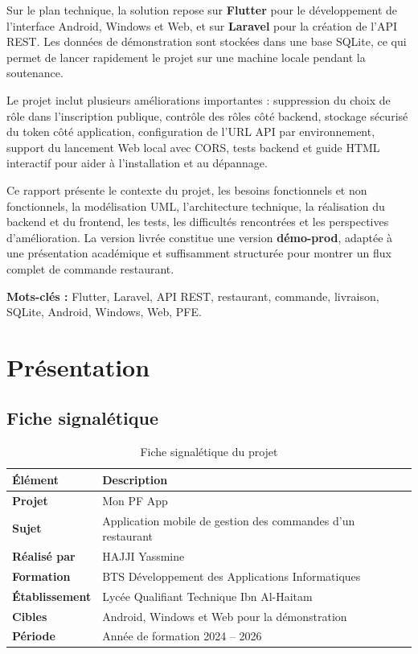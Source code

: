\documentclass[12pt,a4paper]{report}
\newcommand{\field}[2]{\textbf{#1} & #2\\}
\begin{document}
Sur le plan technique, la solution repose sur \textbf{Flutter} pour le développement de l'interface Android, Windows et Web, et sur \textbf{Laravel} pour la création de l'API REST. Les données de démonstration sont stockées dans une base SQLite, ce qui permet de lancer rapidement le projet sur une machine locale pendant la soutenance.

Le projet inclut plusieurs améliorations importantes : suppression du choix de rôle dans l'inscription publique, contrôle des rôles côté backend, stockage sécurisé du token côté application, configuration de l'URL API par environnement, support du lancement Web local avec CORS, tests backend et guide HTML interactif pour aider à l'installation et au dépannage.

Ce rapport présente le contexte du projet, les besoins fonctionnels et non fonctionnels, la modélisation UML, l'architecture technique, la réalisation du backend et du frontend, les tests, les difficultés rencontrées et les perspectives d'amélioration. La version livrée constitue une version \textbf{démo-prod}, adaptée à une présentation académique et suffisamment structurée pour montrer un flux complet de commande restaurant.

\vfill
\noindent\textbf{Mots-clés :} Flutter, Laravel, API REST, restaurant, commande, livraison, SQLite, Android, Windows, Web, PFE.

{}

\chapter{Présentation}
\section{Fiche signalétique}
\begin{table}[H]
\centering
\caption{Fiche signalétique du projet}
\begin{tabular}{p{4cm}p{10cm}}
\toprule
\textbf{Élément} & \textbf{Description}\\
\midrule
\field{Projet}{Mon PF App}
\field{Sujet}{Application mobile de gestion des commandes d'un restaurant}
\field{Réalisé par}{HAJJI Yassmine}
\field{Formation}{BTS Développement des Applications Informatiques}
\field{Établissement}{Lycée Qualifiant Technique Ibn Al-Haitam}
\field{Cibles}{Android, Windows et Web pour la démonstration}
\field{Période}{Année de formation 2024 -- 2026}
\bottomrule
\end{tabular}
\end{table}
\end{document}
